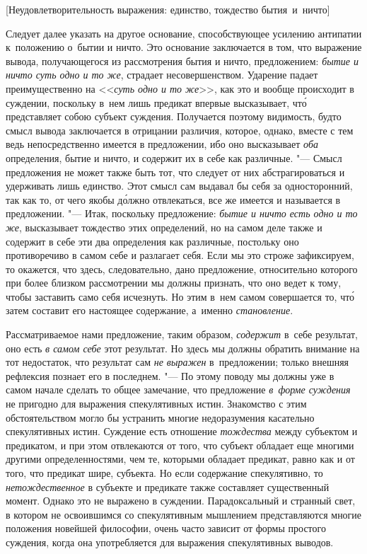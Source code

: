 %
{[Неудовлетворительность выражения: единство, тождество бытия~и~ничто]}

Следует далее указать на другое основание, способствующее усилению антипатии
к~положению о~бытии и ничто. Это основание заключается в том, что выражение
вывода, получающегося из рассмотрения бытия и ничто, предложением:
{\em бытие и ничто суть одно и то же}, страдает несовершенством. Ударение
падает преимущественно на <<{\em суть одно и то же}>>, как это и вообще
происходит в суждении, поскольку в~нем лишь предикат впервые высказывает,
чт\'{о} представляет собою субъект суждения. Получается поэтому видимость,
будто смысл вывода заключается в отрицании различия, которое, однако, вместе с
тем ведь непосредственно имеется в предложении, ибо оно высказывает {\em оба}
определения, бытие и ничто, и содержит их в себе как различные. "--- Смысл
предложения не может также быть тот, что следует от них абстрагироваться и
удерживать лишь единство. Этот смысл сам выдавал бы себя за односторонний, так
как то, от чего якобы д\'{о}лжно отвлекаться, все же имеется и называется в
предложении. "--- Итак, поскольку предложение: {\em бытие и ничто есть одно и
то же}, высказывает тождество этих определений, но на самом деле также и
содержит в себе эти два определения как различные, постольку оно противоречиво
в самом себе и разлагает себя. Если мы это строже зафиксируем, то окажется, что
здесь, следовательно, дано предложение, относительно которого при более близком
рассмотрении мы должны признать, что оно ведет к тому, чтобы заставить само
себя исчезнуть. Но этим в~нем самом совершается то, чт\'{о} затем составит его
настоящее содержание, а~именно {\em становление}.

Рассматриваемое нами предложение, таким образом, {\em содержит} в~себе
результат, оно есть {\em в самом себе} этот результат. Но здесь мы должны
обратить внимание на тот недостаток, что результат сам {\em не выражен}
в~предложении; только внешняя рефлексия познает его в последнем. "--- По этому
поводу мы должны уже в самом начале сделать то общее замечание, что предложение
{\em в~форме суждения} не пригодно для выражения спекулятивных истин.
Знакомство с этим обстоятельством могло бы устранить многие недоразумения
касательно спекулятивных истин. Суждение есть отношение {\em тождества} между
субъектом и предикатом, и при этом отвлекаются от того, что субъект обладает
еще многими другими определенностями, чем те, которыми обладает предикат, равно
как и от того, что предикат шире, субъекта. Но если содержание спекулятивно, то
{\em нетождественное} в субъекте и предикате также составляет существенный
момент. Однако это не выражено в суждении. Парадоксальный и странный свет, в
котором не освоившимся со спекулятивным мышлением представляются многие
положения новейшей философии, очень часто зависит от формы простого суждения,
когда она употребляется для выражения спекулятивных выводов.

